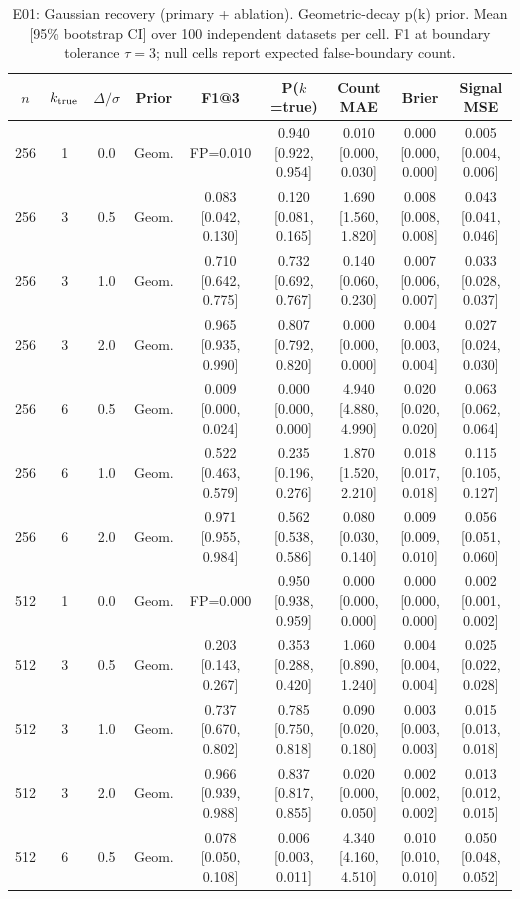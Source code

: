 \begin{table}[htbp]
\centering
\caption{E01: Gaussian recovery (primary + ablation). Geometric-decay p(k) prior. Mean [95\% bootstrap CI] over 100 independent datasets per cell. F1 at boundary tolerance $\tau=3$; null cells report expected false-boundary count.}
\label{tab:planned-recovery-paper}
\footnotesize
\begin{tabular}{ccccccccc}
\toprule
$n$ & $k_{\rm true}$ & $\Delta/\sigma$ & Prior & F1@3 & P($k$=true) & Count MAE & Brier & Signal MSE \\
\midrule
256 & 1 & 0.0 & Geom. & FP=0.010 & 0.940 [0.922, 0.954] & 0.010 [0.000, 0.030] & 0.000 [0.000, 0.000] & 0.005 [0.004, 0.006] \\
256 & 3 & 0.5 & Geom. & 0.083 [0.042, 0.130] & 0.120 [0.081, 0.165] & 1.690 [1.560, 1.820] & 0.008 [0.008, 0.008] & 0.043 [0.041, 0.046] \\
256 & 3 & 1.0 & Geom. & 0.710 [0.642, 0.775] & 0.732 [0.692, 0.767] & 0.140 [0.060, 0.230] & 0.007 [0.006, 0.007] & 0.033 [0.028, 0.037] \\
256 & 3 & 2.0 & Geom. & 0.965 [0.935, 0.990] & 0.807 [0.792, 0.820] & 0.000 [0.000, 0.000] & 0.004 [0.003, 0.004] & 0.027 [0.024, 0.030] \\
256 & 6 & 0.5 & Geom. & 0.009 [0.000, 0.024] & 0.000 [0.000, 0.000] & 4.940 [4.880, 4.990] & 0.020 [0.020, 0.020] & 0.063 [0.062, 0.064] \\
256 & 6 & 1.0 & Geom. & 0.522 [0.463, 0.579] & 0.235 [0.196, 0.276] & 1.870 [1.520, 2.210] & 0.018 [0.017, 0.018] & 0.115 [0.105, 0.127] \\
256 & 6 & 2.0 & Geom. & 0.971 [0.955, 0.984] & 0.562 [0.538, 0.586] & 0.080 [0.030, 0.140] & 0.009 [0.009, 0.010] & 0.056 [0.051, 0.060] \\
\midrule
512 & 1 & 0.0 & Geom. & FP=0.000 & 0.950 [0.938, 0.959] & 0.000 [0.000, 0.000] & 0.000 [0.000, 0.000] & 0.002 [0.001, 0.002] \\
512 & 3 & 0.5 & Geom. & 0.203 [0.143, 0.267] & 0.353 [0.288, 0.420] & 1.060 [0.890, 1.240] & 0.004 [0.004, 0.004] & 0.025 [0.022, 0.028] \\
512 & 3 & 1.0 & Geom. & 0.737 [0.670, 0.802] & 0.785 [0.750, 0.818] & 0.090 [0.020, 0.180] & 0.003 [0.003, 0.003] & 0.015 [0.013, 0.018] \\
512 & 3 & 2.0 & Geom. & 0.966 [0.939, 0.988] & 0.837 [0.817, 0.855] & 0.020 [0.000, 0.050] & 0.002 [0.002, 0.002] & 0.013 [0.012, 0.015] \\
512 & 6 & 0.5 & Geom. & 0.078 [0.050, 0.108] & 0.006 [0.003, 0.011] & 4.340 [4.160, 4.510] & 0.010 [0.010, 0.010] & 0.050 [0.048, 0.052] \\

\end{tabular}
\end{table}
